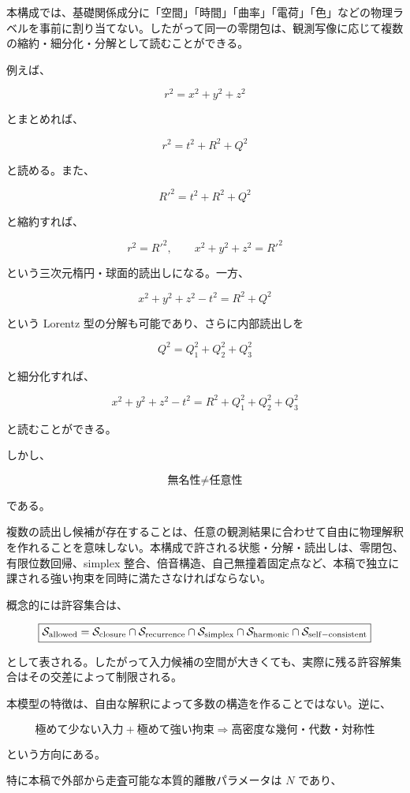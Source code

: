 \documentclass[
  a4paper,
]{ltjsarticle}
\begin{document}
本構成では、基礎関係成分に「空間」「時間」「曲率」「電荷」「色」などの物理ラベルを事前に割り当てない。したがって同一の零閉包は、観測写像に応じて複数の縮約・細分化・分解として読むことができる。

例えば、

\[
r^2=x^2+y^2+z^2
\]

とまとめれば、

\[
r^2=t^2+R^2+Q^2
\]

と読める。また、

\[
R'^2=t^2+R^2+Q^2
\]

と縮約すれば、

\[
r^2=R'^2,
\qquad
x^2+y^2+z^2=R'^2
\]

という三次元楕円・球面的読出しになる。一方、

\[
x^2+y^2+z^2-t^2=R^2+Q^2
\]

という Lorentz 型の分解も可能であり、さらに内部読出しを

\[
Q^2=Q_1^2+Q_2^2+Q_3^2
\]

と細分化すれば、

\[
x^2+y^2+z^2-t^2
=
R^2+Q_1^2+Q_2^2+Q_3^2
\]

と読むことができる。

しかし、

\[
\boxed{\text{無名性}\neq\text{任意性}}
\]

である。

複数の読出し候補が存在することは、任意の観測結果に合わせて自由に物理解釈を作れることを意味しない。本構成で許される状態・分解・読出しは、零閉包、有限位数回帰、simplex
整合、倍音構造、自己無撞着固定点など、本稿で独立に課される強い拘束を同時に満たさなければならない。

概念的には許容集合は、

\[
\boxed{
\mathcal S_{\rm allowed}
=
\mathcal S_{\rm closure}
\cap
\mathcal S_{\rm recurrence}
\cap
\mathcal S_{\rm simplex}
\cap
\mathcal S_{\rm harmonic}
\cap
\mathcal S_{\rm self-consistent}
}
\]

として表される。したがって入力候補の空間が大きくても、実際に残る許容解集合はその交差によって制限される。

本模型の特徴は、自由な解釈によって多数の構造を作ることではない。逆に、

\[
\boxed{
\text{極めて少ない入力}
+
\text{極めて強い拘束}
\Longrightarrow
\text{高密度な幾何・代数・対称性}
}
\]

という方向にある。

特に本稿で外部から走査可能な本質的離散パラメータは \(N\) であり、
\end{document}
